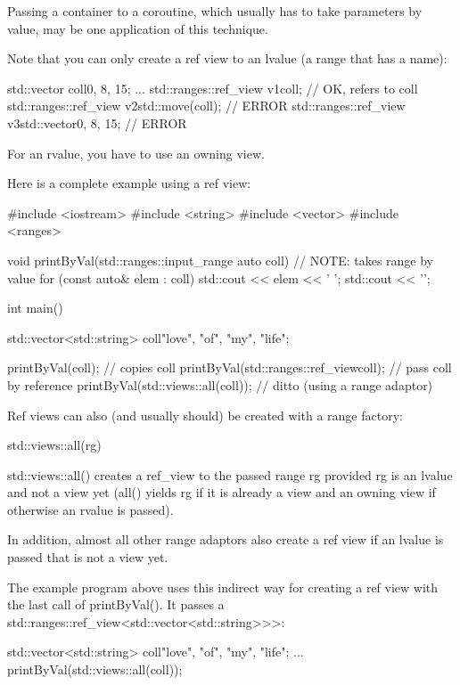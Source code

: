 Passing a container to a coroutine, which usually has to take parameters by value, may be one application of this technique.

Note that you can only create a ref view to an lvalue (a range that has a name):

\begin{cpp}
std::vector coll{0, 8, 15};
...
std::ranges::ref_view v1{coll}; // OK, refers to coll
std::ranges::ref_view v2{std::move(coll)}; // ERROR
std::ranges::ref_view v3{std::vector{0, 8, 15}}; // ERROR
\end{cpp}

For an rvalue, you have to use an owning view.

Here is a complete example using a ref view:


\begin{cpp}
#include <iostream>
#include <string>
#include <vector>
#include <ranges>

void printByVal(std::ranges::input_range auto coll) // NOTE: takes range by value
{
	for (const auto& elem : coll) {
		std::cout << elem << ' ';
	}
	std::cout << '\n';
}

int main()
{
	std::vector<std::string> coll{"love", "of", "my", "life"};
	
	printByVal(coll); // copies coll
	printByVal(std::ranges::ref_view{coll}); // pass coll by reference
	printByVal(std::views::all(coll)); // ditto (using a range adaptor)
}
\end{cpp}


Ref views can also (and usually should) be created with a range factory:

\begin{cpp}
std::views::all(rg)
\end{cpp}

std::views::all() creates a ref\_view to the passed range rg provided rg is an lvalue and not a view yet (all() yields rg if it is already a view and an owning view if otherwise an rvalue is passed).

In addition, almost all other range adaptors also create a ref view if an lvalue is passed that is not a view yet.

The example program above uses this indirect way for creating a ref view with the last call of printByVal(). It passes a std::ranges::ref\_view<std::vector<std::string>{}>{}>:

\begin{cpp}
std::vector<std::string> coll{"love", "of", "my", "life"};
...
printByVal(std::views::all(coll));
\end{cpp}

